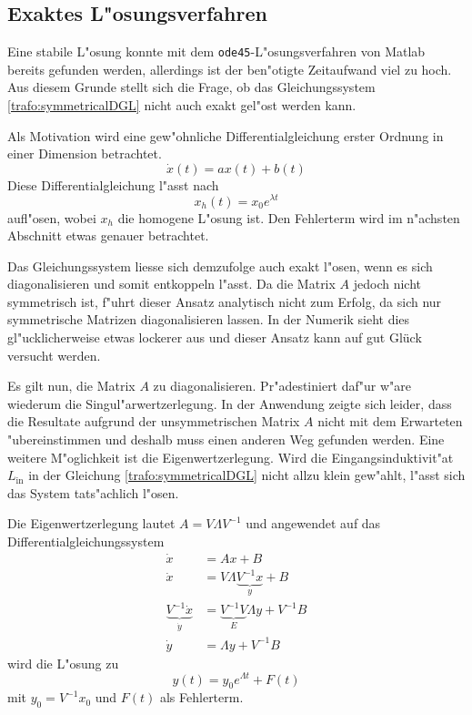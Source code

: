 \begin{refsection}
\subsection{Exaktes L"osungsverfahren}
Eine stabile L"osung konnte mit dem \texttt{ode45}-L"osungsverfahren von Matlab bereits gefunden werden, allerdings ist der ben"otigte Zeitaufwand viel zu hoch. Aus diesem Grunde stellt sich die Frage, ob das Gleichungssystem \ref{trafo:symmetricalDGL} nicht auch exakt gel"ost werden kann.

Als Motivation wird eine gew"ohnliche Differentialgleichung erster Ordnung in einer Dimension betrachtet. 
\begin{equation*}
	\dot{x}(t) = a x(t) + b(t)
	\label{trafo:1D_DGL}
\end{equation*}
Diese Differentialgleichung l"asst nach
\begin{equation*}
	x_h(t) = x_0 e^{\lambda t}
	\label{trafo:homogene_Loesung}
\end{equation*}
aufl"osen, wobei $x_h$ die homogene L"osung ist. Den Fehlerterm wird im n"achsten Abschnitt etwas genauer betrachtet. 

Das Gleichungssystem liesse sich demzufolge auch exakt l"osen, wenn es sich diagonalisieren und somit entkoppeln l"asst. Da die Matrix $A$ jedoch nicht symmetrisch ist, f"uhrt dieser Ansatz analytisch nicht zum Erfolg, da sich nur symmetrische Matrizen diagonalisieren lassen. In der Numerik sieht dies gl"ucklicherweise etwas lockerer aus und dieser Ansatz kann auf gut Glück versucht werden.

Es gilt nun, die Matrix $A$ zu diagonalisieren. Pr"adestiniert daf"ur w"are wiederum die Singul"arwertzerlegung. In der Anwendung zeigte sich leider, dass die Resultate aufgrund der unsymmetrischen Matrix $A$ nicht mit dem Erwarteten "ubereinstimmen und deshalb muss einen anderen Weg gefunden werden. Eine weitere M"oglichkeit ist die Eigenwertzerlegung. Wird die Eingangsinduktivit"at $L_\mathrm{in}$ in der Gleichung \ref{trafo:symmetricalDGL} nicht allzu klein gew"ahlt, l"asst sich das System tats"achlich l"osen.

Die Eigenwertzerlegung lautet $A = V\Lambda V^{-1}$ und angewendet auf das Differentialgleichungssystem 
\begin{align*}
	\dot{x} &= Ax + B \\
	\dot{x} &= V \Lambda \underbrace{V^{-1} x}_{y} + B \\
	\underbrace{V^{-1} \dot{x}}_{\dot{y}} &= \underbrace{V^{-1}V}_{E} \Lambda y + V^{-1} B \\
	\dot{y} &= \Lambda y + V^{-1} B
\end{align*}
wird die L"osung zu
\begin{equation}
	y(t) = y_0 e^{\Lambda t} + F(t)
	\label{trafo:TransfDGL}
\end{equation}
mit $y_0 = V^{-1}x_0$ und $F(t)$ als Fehlerterm.


\end{refsection}
